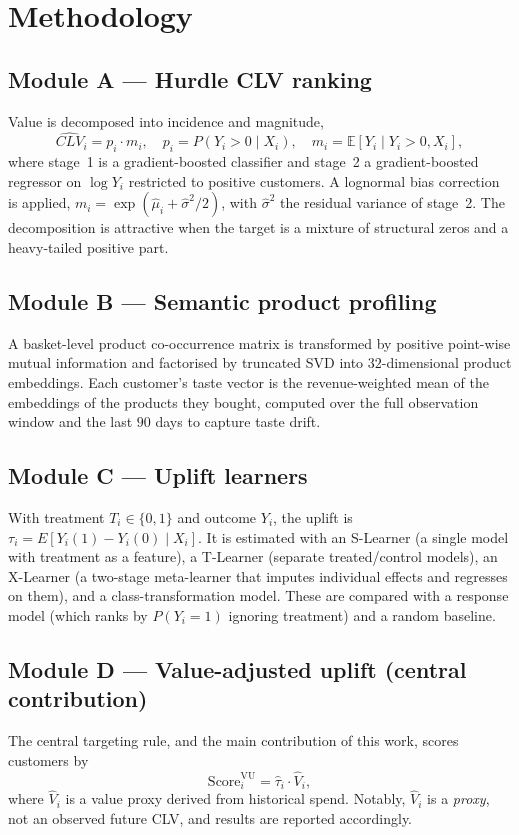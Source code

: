 \documentclass[pdflatex,sn-mathphys-num]{sn-jnl}
\theoremstyle{thmstyleone}
\theoremstyle{thmstylethree}
\begin{document}
\section{Methodology}\label{sec:method}
\subsection{Module A --- Hurdle CLV ranking}
Value is decomposed into incidence and magnitude,
\begin{equation}
\widehat{CLV}_i = p_i \cdot m_i, \quad p_i = P(Y_i>0\mid X_i), \quad m_i = \mathbb{E}[Y_i\mid Y_i>0, X_i],
\end{equation}
where stage~1 is a gradient-boosted classifier and stage~2 a gradient-boosted regressor on
$\log Y_i$ restricted to positive customers. A lognormal bias correction is applied,
$m_i=\exp(\hat\mu_i+\hat\sigma^2/2)$, with $\hat\sigma^2$ the residual variance of stage~2. The
decomposition is attractive when the target is a mixture of structural zeros and a heavy-tailed
positive part.

\subsection{Module B --- Semantic product profiling}
A basket-level product co-occurrence matrix is transformed by positive point-wise mutual
information and factorised by truncated SVD into $32$-dimensional product embeddings. Each
customer's taste vector is the revenue-weighted mean of the embeddings of the products they
bought, computed over the full observation window and the last $90$ days to capture taste drift.

\subsection{Module C --- Uplift learners}
With treatment $T_i\in\{0,1\}$ and outcome $Y_i$, the uplift is
$\tau_i=E[Y_i(1)-Y_i(0)\mid X_i]$. It is estimated with an S-Learner (a single model with treatment
as a feature), a T-Learner (separate treated/control models), an X-Learner (a two-stage
meta-learner that imputes individual effects and regresses on them), and a class-transformation
model. These are compared with a response model (which ranks by $P(Y_i=1)$ ignoring treatment) and a
random baseline.

\subsection{Module D --- Value-adjusted uplift (central contribution)}
The central targeting rule, and the main contribution of this work, scores customers by
\begin{equation}
\text{Score}^{\text{VU}}_i = \hat\tau_i \cdot \hat V_i,
\end{equation}
where $\hat V_i$ is a value proxy derived from historical spend. Notably, $\hat V_i$ is a
\emph{proxy}, not an observed future CLV, and results are reported accordingly.
\end{document}
